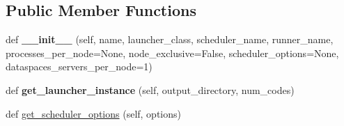 \subsection*{Public Member Functions}
\begin{DoxyCompactItemize}
\item 
\mbox{\label{classcodar_1_1cheetah_1_1machines_1_1_machine_a0dafbcfbb807a0d892f5ac01f80cfb90}} 
def {\bfseries \+\_\+\+\_\+init\+\_\+\+\_\+} (self, name, launcher\+\_\+class, scheduler\+\_\+name, runner\+\_\+name, processes\+\_\+per\+\_\+node=None, node\+\_\+exclusive=False, scheduler\+\_\+options=None, dataspaces\+\_\+servers\+\_\+per\+\_\+node=1)
\item 
\mbox{\label{classcodar_1_1cheetah_1_1machines_1_1_machine_a41429996163dbfc871e502a2b17c3b9d}} 
def {\bfseries get\+\_\+launcher\+\_\+instance} (self, output\+\_\+directory, num\+\_\+codes)
\item 
def \hyperlink{classcodar_1_1cheetah_1_1machines_1_1_machine_ab0b2099ced6d7abf518832a173ed1c14}{get\+\_\+scheduler\+\_\+options} (self, options)
\end{DoxyCompactItemize}
